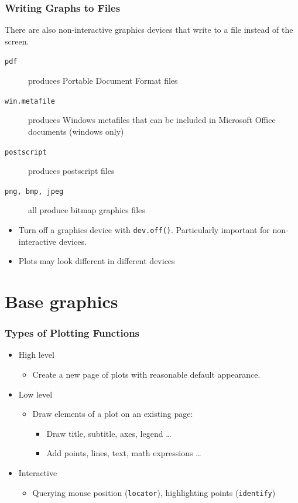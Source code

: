 \documentclass[xcolor=svgnames]{beamer}
\newcommand{\code}[1]{\texttt{#1}}
\begin{document}
\begin{frame}
  \frametitle{Writing Graphs to Files}
  
  There are also non-interactive graphics devices that write 
  to a file instead of the screen.
  \begin{description}
  \item[\code{pdf}] produces Portable Document Format files
  \item[\code{win.metafile}] produces Windows metafiles that can be included in      
  Microsoft Office documents (windows only)
  \item[\code{postscript}] produces postscript files
  \item[\code{png, bmp, jpeg}] all produce bitmap graphics files
  \end{description}
  \begin{itemize}
  \item Turn off a graphics device with \code{dev.off()}. Particularly
    important for non-interactive devices.
  \item Plots may look different in different devices
  \end{itemize}
\end{frame}

\section{Base graphics}

\begin{frame}
  \frametitle{Types of Plotting Functions}
  \begin{itemize}
  \item High level
    \begin{itemize}
      \item Create a new page of plots with reasonable default appearance.
    \end{itemize}
  \item Low level
    \begin{itemize}
      \item Draw elements of a plot on an existing page:
        \begin{itemize}
        \item Draw title, subtitle, axes, legend \dots
        \item Add points, lines, text, math expressions \dots
        \end{itemize}
    \end{itemize}
  \item Interactive
    \begin{itemize}
    \item Querying mouse position (\code{locator}), highlighting
      points (\code{identify})
    \end{itemize}
  \end{itemize}
\end{frame}
\end{document}
